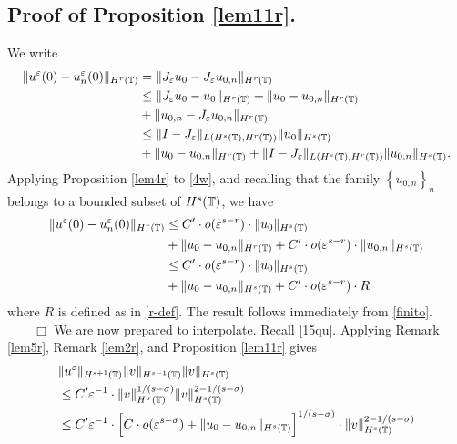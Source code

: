 \subsection{ Proof of Proposition \ref{lem11r}.} We write
\medskip
\begin{equation}
	\begin{split}
		\|u^\varepsilon(0) - u_n^\varepsilon (0) \|_{H^r(\mathbb{T})} 
		& = \|J_\varepsilon u_0 - J_\varepsilon u_{0,n} \|_{H^r(\mathbb{T})}
		\\
		& \le \|J_\varepsilon u_0 - u_0 \|_{H^r(\mathbb{T})} + \| u_0 - u_{0,n}
		\|_{H^r(\mathbb{T})}
		\\
		& + \|u_{0,n} - J_\varepsilon u_{0,n} \|_{H^r(\mathbb{T})}
		\\
		& \le \|I - J_\varepsilon\|_{L(H^s(\mathbb{T}), H^r(\mathbb{T}))} \|u_0\|_{H^s(\mathbb{T})}
		\\
		& +
		\|u_0 - u_{0,n} \|_{H^r(\mathbb{T})} + 
		\|I - J_\varepsilon\|_{L(H^s(\mathbb{T}), H^r(\mathbb{T}))} \|u_{0,n}\|_{H^s(\mathbb{T})}.
		\label{4w}
	\end{split}
\end{equation}
Applying Proposition \ref{lem4r} to \eqref{4w}, and recalling that the family
$\left\{ u_{0,n} \right\}_n$ belongs to a bounded subset of
$H^s(\mathbb{T})$, we have
\medskip
\begin{equation}
	\label{finito}
	\begin{split}
		\|u^\varepsilon(0) - u_n^\varepsilon (0) \|_{H^r(\mathbb{T})} 
		& \le
		C' \cdot o(\varepsilon^{s-r}) \cdot \|u_0\|_{H^s(\mathbb{T})}
		 \\
		 & + \|u_0 - u_{0,n} \|_{H^r(\mathbb{T})} + C' \cdot o (\varepsilon^{s-r}) \cdot
		 \|u_{0,n}\|_{H^s(\mathbb{T})}
		 \\
		 & \le
		 C' \cdot o(\varepsilon^{s-r}) \cdot \|u_0\|_{H^s(\mathbb{T})}
		 \\
		 & + \|u_0 - u_{0,n} \|_{H^s(\mathbb{T})} + C' \cdot o (\varepsilon^{s-r}) \cdot
		 R
	\end{split}
\end{equation}
where $R$ is defined as in \ref{r-def}. The result follows immediately from
\eqref{finito}. $\qquad \Box$
We are now prepared to interpolate. Recall \eqref{15qu}. Applying Remark \ref{lem5r}, Remark \ref{lem2r}, and
Proposition \ref{lem11r} gives
\begin{equation*}
	\begin{split}
		& \|u^\varepsilon \|_{H^{s+1}(\mathbb{T})} \|v\|_{H^{s-1}(\mathbb{T})} \|v\|_{H^s
		(\mathbb{T})}
		\\
		&\le C' \varepsilon^{-1} \cdot \|v\|_{H^\sigma(\mathbb{T})}^{1/(s-\sigma)}
		\|v\|_{H^s(\mathbb{T})}^{2 - 1/(s- \sigma)}
		\\
		& \le C' \varepsilon^{-1} \cdot \Big [C \cdot o(\varepsilon^{s- \sigma}) + \|u_0 -
		u_{0,n}\|_{H^s(\mathbb{T})} \Big ]^{1/(s-\sigma)}
		\cdot \|v\|_{H^s(\mathbb{T})}^{2- 1/(s-\sigma)}
	\end{split}
\end{equation*}
